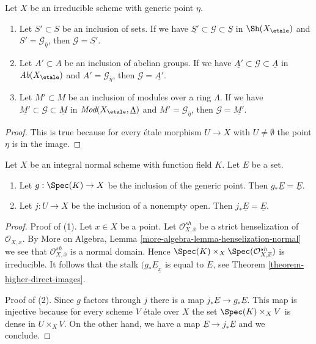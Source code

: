 \begin{lemma}
\label{lemma-irreducible-subsheaf-constant-zero}
Let $X$ be an irreducible scheme with generic point $\eta$.
\begin{enumerate}
\item Let $S' \subset S$ be an inclusion of sets. If we have
$\underline{S'} \subset \mathcal{G} \subset \underline{S}$
in $\Sh(X_\etale)$ and $S' = \mathcal{G}_{\overline{\eta}}$, then
$\mathcal{G} = \underline{S'}$.
\item Let $A' \subset A$ be an inclusion of abelian groups. If we have
$\underline{A'} \subset \mathcal{G} \subset \underline{A}$
in $\textit{Ab}(X_\etale)$ and $A' = \mathcal{G}_{\overline{\eta}}$, then
$\mathcal{G} = \underline{A'}$.
\item Let $M' \subset M$ be an inclusion of modules over a ring $\Lambda$.
If we have $\underline{M'} \subset \mathcal{G} \subset \underline{M}$
in $\textit{Mod}(X_\etale, \underline{\Lambda})$
and $M' = \mathcal{G}_{\overline{\eta}}$, then
$\mathcal{G} = \underline{M'}$.
\end{enumerate}
\end{lemma}

\begin{proof}
This is true because for every \'etale morphism $U \to X$
with $U \not = \emptyset$ the point $\eta$ is in the image.
\end{proof}

\begin{lemma}
\label{lemma-push-constant-sheaf-from-open}
Let $X$ be an integral normal scheme with function field $K$.
Let $E$ be a set.
\begin{enumerate}
\item Let $g : \Spec(K) \to X$ be the inclusion of the generic point.
Then $g_*\underline{E} = \underline{E}$.
\item Let $j : U \to X$ be the inclusion of a nonempty open. Then
$j_*\underline{E} = \underline{E}$.
\end{enumerate}
\end{lemma}

\begin{proof}
Proof of (1). Let $x \in X$ be a point. Let
$\mathcal{O}^{sh}_{X, \overline{x}}$
be a strict henselization of $\mathcal{O}_{X, x}$. 
By More on Algebra, Lemma \ref{more-algebra-lemma-henselization-normal}
we see that $\mathcal{O}^{sh}_{X, \overline{x}}$ is a normal domain.
Hence $\Spec(K) \times_X \Spec(\mathcal{O}^{sh}_{X, \overline{x}})$
is irreducible. It follows that
the stalk $(g_*\underline{E}_{\underline{x}}$ is equal to $E$,
see Theorem \ref{theorem-higher-direct-images}.

\medskip\noindent
Proof of (2). Since $g$ factors through $j$ there is a map
$j_*\underline{E} \to g_*\underline{E}$. This map is injective because
for every scheme $V$ \'etale over $X$ the set $\Spec(K) \times_X V$
is dense in $U \times_X V$. On the other hand, we have a map
$\underline{E} \to j_*\underline{E}$ and we conclude.
\end{proof}

